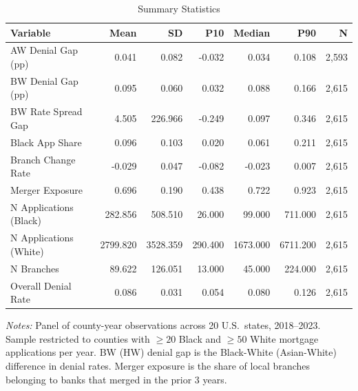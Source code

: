 \begin{table}[htbp]
\centering
\caption{Summary Statistics}
\label{tab:summary}
\begin{threeparttable}
\begin{tabular}{lrrrrrr}
\hline\hline
Variable & Mean & SD & P10 & Median & P90 & N \\
\hline
AW Denial Gap (pp) & 0.041 & 0.082 & -0.032 & 0.034 & 0.108 & 2,593 \\
BW Denial Gap (pp) & 0.095 & 0.060 & 0.032 & 0.088 & 0.166 & 2,615 \\
BW Rate Spread Gap & 4.505 & 226.966 & -0.249 & 0.097 & 0.346 & 2,615 \\
Black App Share & 0.096 & 0.103 & 0.020 & 0.061 & 0.211 & 2,615 \\
Branch Change Rate & -0.029 & 0.047 & -0.082 & -0.023 & 0.007 & 2,615 \\
Merger Exposure & 0.696 & 0.190 & 0.438 & 0.722 & 0.923 & 2,615 \\
N Applications (Black) & 282.856 & 508.510 & 26.000 & 99.000 & 711.000 & 2,615 \\
N Applications (White) & 2799.820 & 3528.359 & 290.400 & 1673.000 & 6711.200 & 2,615 \\
N Branches & 89.622 & 126.051 & 13.000 & 45.000 & 224.000 & 2,615 \\
Overall Denial Rate & 0.086 & 0.031 & 0.054 & 0.080 & 0.126 & 2,615 \\
\hline\hline
\end{tabular}
\begin{tablenotes}\small
\item \textit{Notes:} Panel of county-year observations across 20 U.S.\ states, 2018--2023. Sample restricted to counties with $\geq 20$ Black and $\geq 50$ White mortgage applications per year. BW (HW) denial gap is the Black-White (Asian-White) difference in denial rates. Merger exposure is the share of local branches belonging to banks that merged in the prior 3 years.
\end{tablenotes}
\end{threeparttable}
\end{table}

